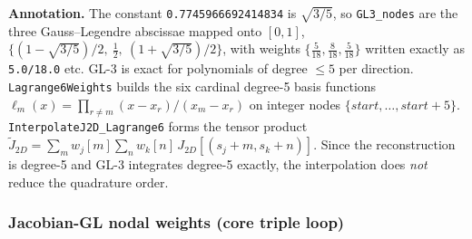 \documentclass[11pt]{article}
\theoremstyle{definition}
\theoremstyle{remark}
\begin{document}
\noindent\textbf{Annotation.} The constant \texttt{0.7745966692414834} is
$\sqrt{3/5}$, so \texttt{GL3\_nodes} are the three Gauss--Legendre abscissae mapped
onto $[0,1]$, $\{(1-\sqrt{3/5})/2,\ \tfrac12,\ (1+\sqrt{3/5})/2\}$, with weights
$\{\tfrac{5}{18},\tfrac{8}{18},\tfrac{5}{18}\}$ written exactly as
\texttt{5.0/18.0} etc. GL-3 is exact for polynomials of degree $\le 5$ per
direction. \texttt{Lagrange6Weights} builds the six cardinal degree-5 basis
functions $\ell_m(x)=\prod_{r\neq m}(x-x_r)/(x_m-x_r)$ on integer nodes
$\{start,\dots,start{+}5\}$. \texttt{InterpolateJ2D\_Lagrange6} forms the tensor
product $\tilde J_{2D}=\sum_{m}w_j[m]\sum_{n}w_k[n]\,J_{2D}[(s_j{+}m,s_k{+}n)]$.
Since the reconstruction is degree-5 and GL-3 integrates degree-5 exactly, the
interpolation does \emph{not} reduce the quadrature order.

\subsubsection{Jacobian-GL nodal weights (core triple loop)}
\end{document}
